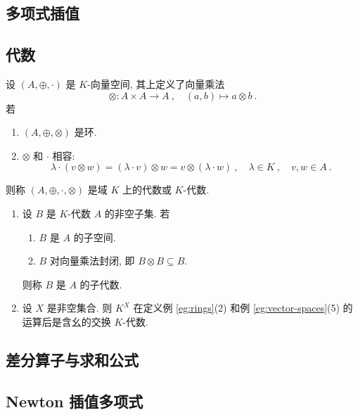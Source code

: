 \subsection{多项式插值}

\subsection{代数}

\begin{axiom}[代数]
    设 \((A, \oplus, \cdot)\) 是 \(K\)-向量空间, 其上定义了向量乘法
    \[
        \otimes \colon A \times A \to A\ ,\quad (a, b) \mapsto a \otimes b\ .
    \]
    若
    \begin{enumerate}[label={\((\mathrm A_{\arabic*})\)}]
        \item \((A, \oplus, \otimes)\) 是环.
        \item \(\otimes\) 和 \(\cdot\) 相容:
        \[
            \lambda \cdot (v \otimes w) = (\lambda \cdot v) \otimes w = v \otimes (\lambda \cdot w)\ ,\quad \lambda \in K\ ,\quad v, w \in A\ .
        \]
    \end{enumerate}
    则称 \((A, \oplus, \cdot, \otimes)\) 是域 \(K\) 上的代数或 \(K\)-代数.
\end{axiom}

\begin{example}\label{eg:algebras}
    \begin{enumerate}
        \item 设 \(B\) 是 \(K\)-代数 \(A\) 的非空子集. 若
        \begin{enumerate}[label={\((\mathrm{SA}_{\arabic*})\)}]
            \item \(B\) 是 \(A\) 的子空间.
            \item \(B\) 对向量乘法封闭, 即 \(B \otimes B \subseteq B\).
        \end{enumerate}
        则称 \(B\) 是 \(A\) 的子代数.
        \item 设 \(X\) 是非空集合. 则 \(K^X\) 在定义例 \ref{eg:rings}(2) 和例 \ref{eg:vector-spaces}(5) 的运算后是含幺的交换 \(K\)-代数.
    \end{enumerate}
\end{example}

\subsection{差分算子与求和公式}

\subsection{Newton 插值多项式}